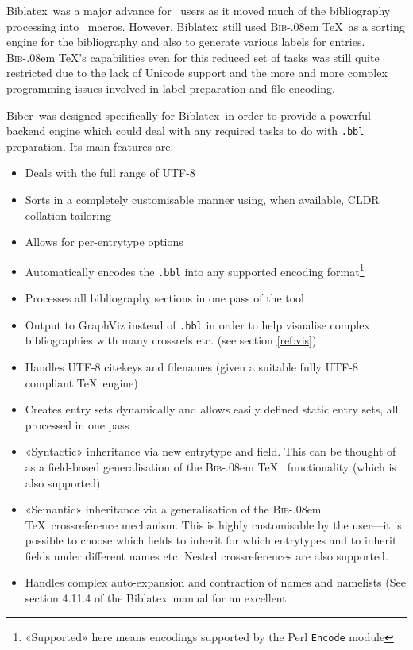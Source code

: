 \documentclass{ltxdockit}
\def\BibTeX{\textsc{Bib}\kern-.08em \TeX}
\newcommand*{\biber}{Biber\xspace}
\newcommand*{\biblatex}{Biblatex\xspace}
\begin{document}
\biblatex\ was a major advance for \latex\ users as it moved much
of the bibliography processing into \latex\ macros. However,
\biblatex\ still used \BibTeX\ as a sorting engine for the
bibliography and also to generate various labels for
entries. \BibTeX's capabilities even for this reduced set of
tasks was still quite restricted due to the lack of Unicode support and
the more and more complex programming issues involved in label
preparation and file encoding.

\biber\ was designed specifically for \biblatex\ in order to
provide a powerful backend engine which could deal with any required
tasks to do with \verb+.bbl+ preparation. Its main features are:

\begin{itemize}
\item Deals with the full range of UTF-8
\item Sorts in a completely customisable manner using, when available,
  CLDR collation tailoring
\item Allows for per-entrytype options
\item Automatically encodes the \verb+.bbl+ into any supported encoding
  format\footnote{«Supported» here means encodings supported by the
    Perl \texttt{Encode} module}
\item Processes all bibliography sections in one pass of the tool
\item Output to GraphViz instead of \verb+.bbl+ in order to help visualise
  complex bibliographies with many crossrefs etc. (see section \ref{ref:vis})
\item Handles UTF-8 citekeys and filenames (given a suitable fully
  UTF-8 compliant \TeX\ engine)
\item Creates entry sets dynamically and allows easily defined static entry sets,
  all processed in one pass
\item «Syntactic» inheritance via new  entrytype and
  field. This can be thought of as a field-based generalisation of the
  \BibTeX\  functionality (which is also supported).
\item «Semantic» inheritance via a generalisation of the \BibTeX\
  crossreference mechanism. This is highly customisable by the
  user---it is possible to choose which fields to inherit for which
  entrytypes and to inherit fields under different names etc. Nested
  crossreferences are also supported.
\item Handles complex auto-expansion and contraction of names and
  namelists (See section 4.11.4 of the \biblatex\ manual for an excellent

\end{itemize}
\end{document}
